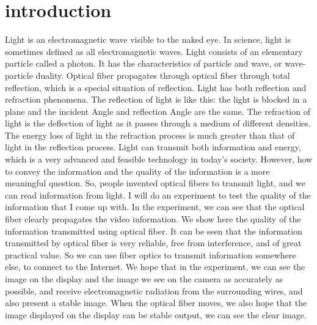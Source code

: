 \documentclass[a4paper]{article}
\begin{document}
\begin{abstract}
\end{abstract}\maketitle
\section{introduction}
\label{sec:Intro}
Light is an electromagnetic wave visible to the naked eye. In science, light is sometimes defined as all electromagnetic waves. Light consists of an elementary particle called a photon. It has the characteristics of particle and wave, or wave-particle duality. Optical fiber propagates through optical fiber through total reflection, which is a special situation of reflection. Light has both reflection and refraction phenomena. The reflection of light is like this: the light is blocked in a plane and the incident Angle and reflection Angle are the same. The refraction of light is the deflection of light as it passes through a medium of different densities. The energy loss of light in the refraction process is much greater than that of light in the reflection process. Light can transmit both information and energy, which is a very advanced and feasible technology in today's society. However, how to convey the information and the quality of the information is a more meaningful question. So, people invented optical fibers to transmit light, and we can read information from light. I will do an experiment to test the quality of the information that I come up with. In the experiment, we can see that the optical fiber clearly propagates the video information. We show here the quality of the information transmitted using optical fiber. It can be seen that the information transmitted by optical fiber is very reliable, free from interference, and of great practical value. So we can use fiber optics to transmit information somewhere else, to connect to the Internet. We hope that in the experiment, we can see the image on the display and the image we see on the camera as accurately as possible, and receive electromagnetic radiation from the surrounding wires, and also present a stable image. When the optical fiber moves, we also hope that the image displayed on the display can be stable output, we can see the clear image.
\\
\end{document}
